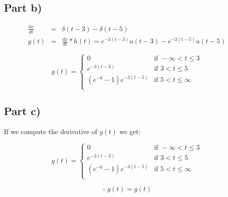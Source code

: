 \documentclass[20pt]{article}
\begin{document}
\subsection*{Part b)}



\begin{eqnarray}
    \frac{d x}{d t} &=& \delta(t-3) - \delta(t-5) \\
    g(t) &=& \frac{d x}{d t} * h(t) = e^{-3(t-3)}u(t-3) - e^{-3(t-5)}u(t-5)
\end{eqnarray}

\begin{equation}
    g(t)=
    \begin{cases}
        0                     & \text{if } -\infty < t \leq 3 \\
        e^{-3(t-3)}           & \text{if } 3 < t \leq 5       \\
        (e^{-6}-1)e^{-3(t-5)} & \text{if } 5 < t \leq \infty  \\
    \end{cases}
\end{equation}

\subsection*{Part c)}

If we compute the derivative of $ y(t) $ we get:

\begin{equation}
    y(t)=
    \begin{cases}
        0                     & \text{if } -\infty < t \leq 3 \\
        e^{-3(t-3)}           & \text{if } 3 < t \leq 5       \\
        (e^{-6}-1)e^{-3(t-5)} & \text{if } 5 < t \leq \infty  \\
    \end{cases}
\end{equation}

\[\therefore \ y(t) = g(t)\]
\end{document}
